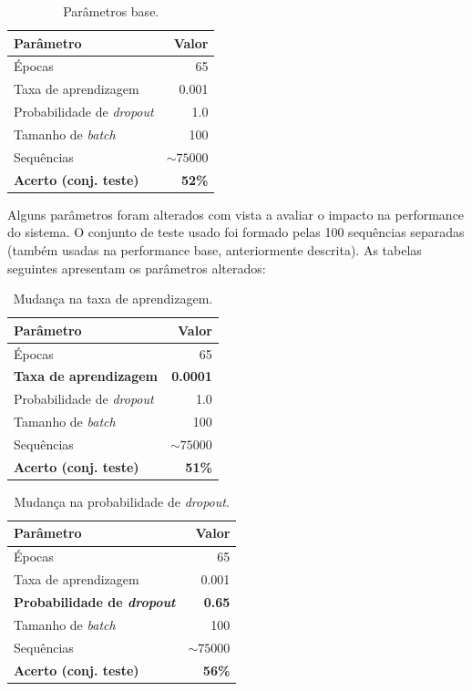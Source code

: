 \begin{table}[H]
\centering
\begin{tabular}{|l|r|}
\hline
\textbf{Parâmetro} & \textbf{Valor}\\
\hline
\hline
Épocas & 65  \\
\hline
Taxa de aprendizagem & 0.001  \\
\hline
Probabilidade de \textit{dropout} & 1.0  \\
\hline
Tamanho de \textit{batch} & 100  \\
\hline
Sequências & $\sim75000$  \\
\hline
\hline
\textbf{Acerto (conj. teste)} & \textbf{52\%}\\
\hline
\end{tabular}
\caption{Parâmetros base.}
\label{tab:base}
\end{table}

\noindent Alguns parâmetros foram alterados com vista a avaliar o impacto na performance do sistema. O conjunto de teste usado foi formado pelas 100 sequências separadas (também usadas na performance base, anteriormente descrita). As tabelas seguintes apresentam os parâmetros alterados:

\begin{table}[H]
\centering
\begin{tabular}{|l|r|}
\hline
\textbf{Parâmetro} & \textbf{Valor}\\
\hline
\hline
Épocas & 65  \\
\hline
\textbf{Taxa de aprendizagem} & \textbf{0.0001}  \\
\hline
Probabilidade de \textit{dropout} & 1.0  \\
\hline
Tamanho de \textit{batch} & 100  \\
\hline
Sequências & $\sim75000$  \\
\hline
\hline
\textbf{Acerto (conj. teste)} & \textbf{51\%}\\
\hline
\end{tabular}
\caption{Mudança na taxa de aprendizagem.}
\label{tab:learning_rate}
\end{table}

\begin{table}[H]
\centering
\begin{tabular}{|l|r|}
\hline
\textbf{Parâmetro} & \textbf{Valor}\\
\hline
\hline
Épocas & 65  \\
\hline
Taxa de aprendizagem & 0.001  \\
\hline
\textbf{Probabilidade de \textit{dropout}} & \textbf{0.65}  \\
\hline
Tamanho de \textit{batch} & 100  \\
\hline
Sequências & $\sim75000$  \\
\hline
\hline
\textbf{Acerto (conj. teste)} & \textbf{56\%}\\
\hline
\end{tabular}
\caption{Mudança na probabilidade de \textit{dropout}.}
\label{tab:dropout}
\end{table}


